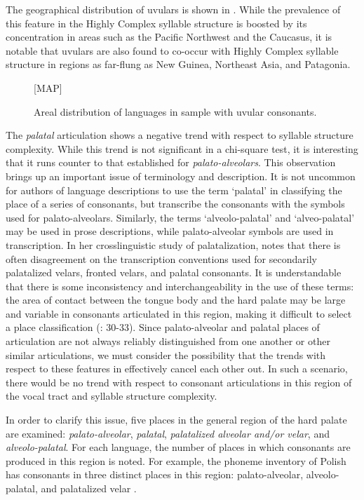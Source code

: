   The geographical distribution of uvulars is shown in . While the prevalence of this feature in the Highly Complex syllable structure is boosted by its concentration in areas such as the Pacific Northwest and the Caucasus, it is notable that uvulars are also found to co-occur with Highly Complex syllable structure in regions as far-flung as New Guinea, Northeast Asia, and Patagonia.

\begin{figure}
{}[MAP]

\caption{\label{fig:4.9} Areal distribution of languages in sample with uvular consonants.}
\end{figure}

  The \textit{palatal} articulation shows a negative trend with respect to syllable structure complexity. While this trend is not significant in a chi-square test, it is interesting that it runs counter to that established for \textit{palato-alveolars}. This observation brings up an important issue of terminology and description. It is not uncommon for authors of language descriptions to use the term ‘palatal’ in classifying the place of a series of consonants, but transcribe the consonants with the symbols used for palato-alveolars. Similarly, the terms ‘alveolo-palatal’ and ‘alveo-palatal’ may be used in prose descriptions, while palato-alveolar symbols are used in transcription. In her crosslinguistic study of palatalization, \citet{Bateman2007} notes that there is often disagreement on the transcription conventions used for secondarily palatalized velars, fronted velars, and palatal consonants. It is understandable that there is some inconsistency and interchangeability in the use of these terms: the area of contact between the tongue body and the hard palate may be large and variable in consonants articulated in this region, making it difficult to select a place classification (\citealt{LadefogedMaddieson1996}: 30-33). Since palato-alveolar and palatal places of articulation are not always reliably distinguished from one another or other similar articulations, we must consider the possibility that the trends with respect to these features in  effectively cancel each other out. In such a scenario, there would be no trend with respect to consonant articulations in this region of the vocal tract and syllable structure complexity.

  In order to clarify this issue, five places in the general region of the hard palate are examined: \textit{palato-alveolar}, \textit{palatal}, \textit{palatalized alveolar and/or velar}, and \textit{alveolo-palatal}. For each language, the number of places in which consonants are produced in this region is noted. For example, the phoneme inventory of Polish has consonants in three distinct places in this region: palato-alveolar, alveolo-palatal, and palatalized velar .

